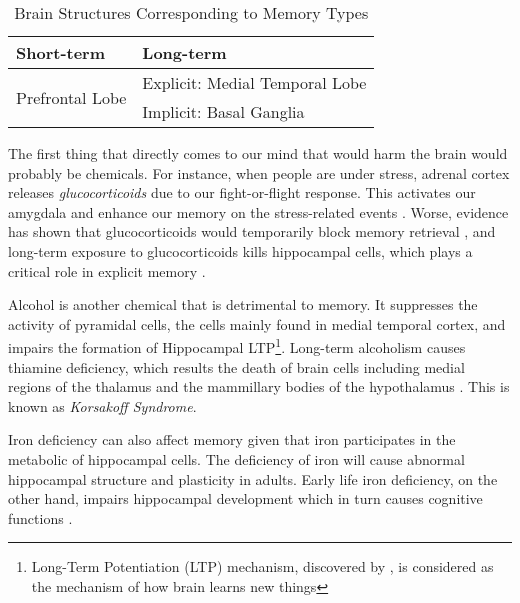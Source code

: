 \documentclass{article}
\begin{document}
\begin{table}[h]
\centering
\begin{tabular}{@{}ll@{}}
    \toprule
    Short-term      & Long-term \\
    \midrule
    \multirow{2}{*}{Prefrontal Lobe \tablefootnote{\cite{fusterCrossmodalCrosstemporalAssociation2000}}} & Explicit: Medial Temporal Lobe\tablefootnote{\cite{squireMedialTemporalLobe1991}}\\
                                                     & Implicit: Basal Ganglia \tablefootnote{\cite{foerdeRoleBasalGanglia2011}}\\
    \bottomrule
\end{tabular}
\caption{Brain Structures Corresponding to Memory Types}
\label{BrainStructMemoryTypes}
\end{table}

The first thing that directly comes to our mind that would harm the brain would probably be chemicals. For instance, when people are under stress, adrenal cortex releases \textit{glucocorticoids} due to our fight-or-flight response. This activates our amygdala and enhance our memory on the stress-related events \autocite{sapolskyStressAgingBrain1992}. Worse, evidence has shown that glucocorticoids would temporarily block memory retrieval \autocite[pp.119-144]{roozendaalStressMemoryAmygdala2009}, and long-term exposure to glucocorticoids kills hippocampal cells, which plays a critical role in explicit memory \autocite{sapolskyStressAgingBrain1992}. 

Alcohol is another chemical that is detrimental to memory. It suppresses the activity of pyramidal cells, the cells mainly found in medial temporal cortex, and impairs the formation of Hippocampal LTP\footnote{Long-Term Potentiation (LTP) mechanism, discovered by \textcite{blissLonglastingPotentiationSynaptic1973}, is considered as the mechanism of how brain learns new things}. Long-term alcoholism causes thiamine deficiency, which results the death of brain cells including medial regions of the thalamus and the mammillary bodies of the hypothalamus \autocite{martinRoleThiamineDeficiency2003}. This is known as \textit{Korsakoff Syndrome}. 

Iron deficiency can also affect memory given that iron participates in the metabolic of hippocampal cells. The deficiency of iron will cause abnormal hippocampal structure and plasticity in adults. Early life iron deficiency, on the other hand, impairs hippocampal development which in turn causes cognitive functions \autocite{frethamRoleIronLearning2011}.
\end{document}

